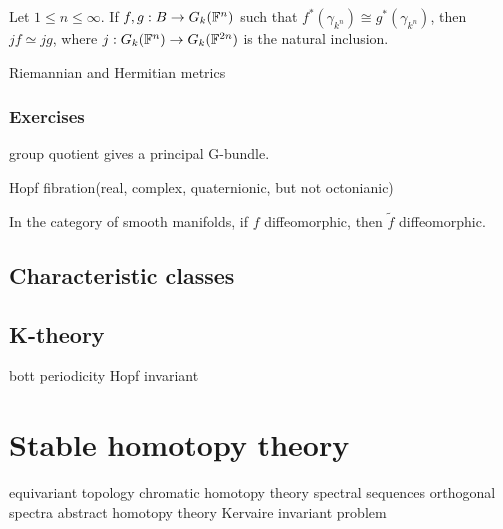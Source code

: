 \documentclass{../../large}
\begin{document}
Let $1\le n\le\infty$.
If $f,g:B\to G_k(\mathbb{F}^n)$ such that $f^*(\gamma_{k^n})\cong g^*(\gamma_{k^n})$, then $jf\simeq jg$, where $j:G_k(\mathbb{F}^n)\to G_k(\mathbb{F}^{2n})$ is the natural inclusion.


\begin{prb}
Riemannian and Hermitian metrics
\end{prb}

\section*{Exercises}

group quotient gives a principal G-bundle.

Hopf fibration(real, complex, quaternionic, but not octonianic)

In the category of smooth manifolds, if $f$ diffeomorphic, then $\tilde f$ diffeomorphic.



\chapter{Characteristic classes}


\chapter{K-theory}

bott periodicity
Hopf invariant





\part{Stable homotopy theory}
equivariant topology
chromatic homotopy theory
spectral sequences
orthogonal spectra
abstract homotopy theory
Kervaire invariant problem
\end{document}
